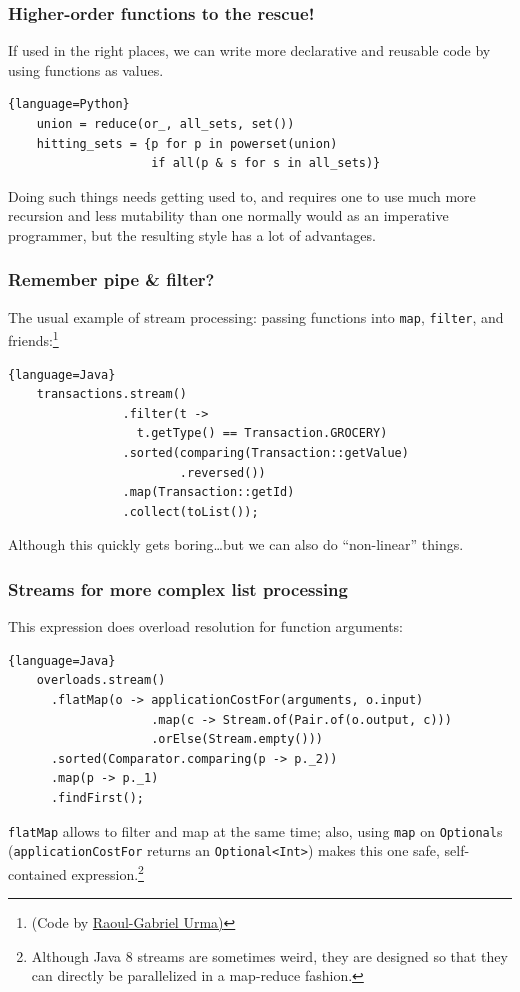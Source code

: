 \documentclass{beamer}
\begin{document}
\begin{frame}[containsverbatim]
  \frametitle{Higher-order functions to the rescue!} 

  If used in the right places, we can write more declarative and reusable code by using functions as
  values.

  \begin{lstlisting}{language=Python}
    union = reduce(or_, all_sets, set())
    hitting_sets = {p for p in powerset(union) 
                    if all(p & s for s in all_sets)}
  \end{lstlisting}

  Doing such things needs getting used to, and requires one to use much more recursion and less
  mutability than one normally would as an imperative programmer, but the resulting style has a lot
  of advantages.
\end{frame}


\begin{frame}[containsverbatim]
  \frametitle{Remember pipe \& filter?} 

  The usual example of stream processing: passing functions into \lstinline|map|,
  \lstinline|filter|, and friends:\footnote{(Code by
    \href{http://www.oracle.com/technetwork/articles/java/ma14-java-se-8-streams-2177646.html}{%
      Raoul-Gabriel Urma)}}

  \begin{lstlisting}{language=Java}
    transactions.stream()
                .filter(t -> 
                  t.getType() == Transaction.GROCERY)
                .sorted(comparing(Transaction::getValue)
                        .reversed())
                .map(Transaction::getId)
                .collect(toList());
  \end{lstlisting}

  Although this quickly gets boring\ldots but we can also do \enquote{non-linear} things.
\end{frame}

\begin{frame}[containsverbatim]
  \frametitle{Streams for more complex list processing} 

  This expression does overload resolution for function arguments:

  \begin{lstlisting}{language=Java}
    overloads.stream()
      .flatMap(o -> applicationCostFor(arguments, o.input)
                    .map(c -> Stream.of(Pair.of(o.output, c)))
                    .orElse(Stream.empty()))
      .sorted(Comparator.comparing(p -> p._2))
      .map(p -> p._1)
      .findFirst();
  \end{lstlisting}

  \lstinline|flatMap| allows to filter and map at the same time; also, using \lstinline|map| on 
  \lstinline|Optional|s (\lstinline|applicationCostFor| returns an \lstinline|Optional<Int>|) makes
  this one safe, self-contained expression.\footnote{Although Java 8 streams are sometimes weird,
    they are designed so that they can directly be parallelized in a map-reduce fashion.}
\end{frame}
\end{document}
